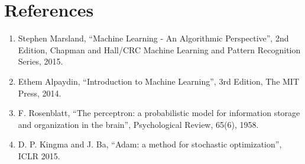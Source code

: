 \documentclass[12pt,a4paper]{article}
\begin{document}
\section{References}
\begin{enumerate}
\item Stephen Marsland, ``Machine Learning - An Algorithmic Perspective'', 2nd Edition, Chapman and
Hall/CRC Machine Learning and Pattern Recognition Series, 2015.
\item Ethem Alpaydin, ``Introduction to Machine Learning'', 3rd Edition, The MIT Press, 2014.
\item F. Rosenblatt, ``The perceptron: a probabilistic model for information storage and organization in the brain'',
Psychological Review, 65(6), 1958.
\item D. P. Kingma and J. Ba, ``Adam: a method for stochastic optimization'', ICLR 2015.
\end{enumerate}
\end{document}
